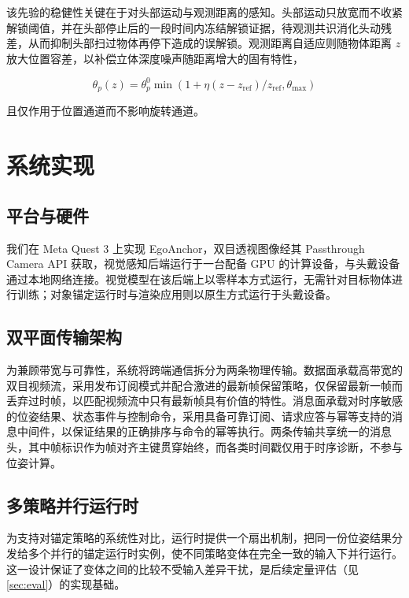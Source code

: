 \documentclass[review]{vgtc}
\begin{document}
该先验的稳健性关键在于对头部运动与观测距离的感知。头部运动只放宽而不收紧解锁阈值，并在头部停止后的一段时间内冻结解锁证据，待观测共识消化头动残差，从而抑制头部扫过物体再停下造成的误解锁。观测距离自适应则随物体距离 $z$ 放大位置容差，以补偿立体深度噪声随距离增大的固有特性，

\begin{equation}
\theta_p(z) = \theta_p^0 \min\!\left(1 + \eta (z - z_{\mathrm{ref}}) / z_{\mathrm{ref}}, \theta_{\mathrm{max}}\right)
\label{eq:distadapt}
\end{equation}


且仅作用于位置通道而不影响旋转通道。

\section{系统实现}\label{sec:impl}


\subsection{平台与硬件}


我们在 Meta Quest 3 上实现 EgoAnchor，双目透视图像经其 Passthrough Camera API 获取，视觉感知后端运行于一台配备 GPU 的计算设备，与头戴设备通过本地网络连接。视觉模型在该后端上以零样本方式运行，无需针对目标物体进行训练；对象锚定运行时与渲染应用则以原生方式运行于头戴设备。

\subsection{双平面传输架构}


为兼顾带宽与可靠性，系统将跨端通信拆分为两条物理传输。数据面承载高带宽的双目视频流，采用发布订阅模式并配合激进的最新帧保留策略，仅保留最新一帧而丢弃过时帧，以匹配视频流中只有最新帧具有价值的特性。消息面承载对时序敏感的位姿结果、状态事件与控制命令，采用具备可靠订阅、请求应答与幂等支持的消息中间件，以保证结果的正确排序与命令的幂等执行。两条传输共享统一的消息头，其中帧标识作为帧对齐主键贯穿始终，而各类时间戳仅用于时序诊断，不参与位姿计算。

\subsection{多策略并行运行时}


为支持对锚定策略的系统性对比，运行时提供一个扇出机制，把同一份位姿结果分发给多个并行的锚定运行时实例，使不同策略变体在完全一致的输入下并行运行。这一设计保证了变体之间的比较不受输入差异干扰，是后续定量评估（见 \ref{sec:eval}）的实现基础。
\end{document}
